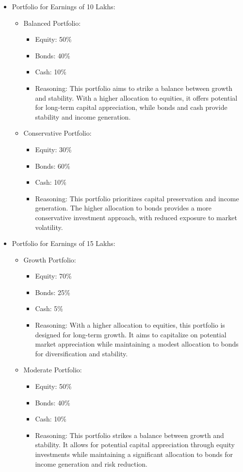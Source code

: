 \begin{itemize}
  \item Portfolio for Earnings of 10 Lakhs:
  \begin{itemize}
    \item Balanced Portfolio:
    \begin{itemize}
      \item Equity: 50\%
      \item Bonds: 40\%
      \item Cash: 10\%
      \item Reasoning: This portfolio aims to strike a balance between growth and stability. With a higher allocation to equities, it offers potential for long-term capital appreciation, while bonds and cash provide stability and income generation.
    \end{itemize}
    \item Conservative Portfolio:
    \begin{itemize}
      \item Equity: 30\%
      \item Bonds: 60\%
      \item Cash: 10\%
      \item Reasoning: This portfolio prioritizes capital preservation and income generation. The higher allocation to bonds provides a more conservative investment approach, with reduced exposure to market volatility.
    \end{itemize}
  \end{itemize}
  
  \item Portfolio for Earnings of 15 Lakhs:
  \begin{itemize}
    \item Growth Portfolio:
    \begin{itemize}
      \item Equity: 70\%
      \item Bonds: 25\%
      \item Cash: 5\%
      \item Reasoning: With a higher allocation to equities, this portfolio is designed for long-term growth. It aims to capitalize on potential market appreciation while maintaining a modest allocation to bonds for diversification and stability.
    \end{itemize}
    \item Moderate Portfolio:
    \begin{itemize}
      \item Equity: 50\%
      \item Bonds: 40\%
      \item Cash: 10\%
      \item Reasoning: This portfolio strikes a balance between growth and stability. It allows for potential capital appreciation through equity investments while maintaining a significant allocation to bonds for income generation and risk reduction.
    \end{itemize}
  \end{itemize}
  

\end{itemize}
